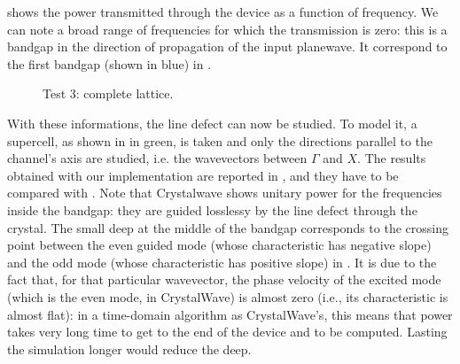   shows the power transmitted
through the device as a function of frequency. We can note a broad
range of frequencies for which the transmission is zero: this is a
bandgap in the direction of propagation of the input planewave. It
correspond to the first bandgap (shown in blue) in
.

\begin{figure}[htbp]
  \begin{center}
  \end{center}
  \caption{Test 3: complete lattice.}
  \label{fig:test_3}
\end{figure}

With these informations, the line defect can now be studied. To model it, a supercell, as shown
in  in green, is taken and only the
directions parallel to the channel's axis are studied, i.e. the
wavevectors between $\Gamma$ and $X$. The results
obtained with our implementation are reported in
, and they have to be compared with
. Note that Crystalwave shows unitary
power for the frequencies inside the bandgap: they are guided
losslessy by the line defect through the crystal. The small deep at
the middle of the bandgap corresponds to the crossing point between
the even guided mode (whose characteristic has negative slope) and the
odd mode (whose characteristic has positive slope) in
. It is due to the fact that, for that
particular wavevector, the phase
velocity of the excited mode (which is the even mode, in CrystalWave)
is almost zero (i.e., its characteristic is almost flat): in a time-domain
algorithm as CrystalWave's, this means that power takes very long time to
get to the end of the device and to be computed. Lasting the
simulation longer would reduce the deep.

